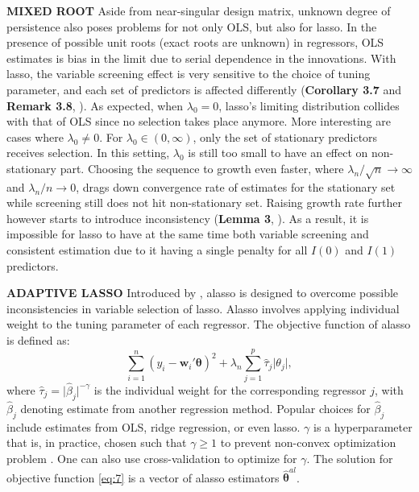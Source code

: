 \documentclass[12pt,a4paper]{article}
\DeclareMathOperator*{\argmin}{arg\,min} %
\begin{document}
\textbf{MIXED ROOT} Aside from near-singular design matrix, unknown degree of persistence also poses problems for not only OLS, but also for lasso. In the presence of possible unit roots (exact roots are unknown) in regressors, OLS estimates is bias in the limit due to serial dependence in the innovations. With lasso, the variable screening effect is very sensitive to the choice of tuning parameter, and each set of predictors is affected differently (\textbf{Corollary 3.7} and \textbf{Remark 3.8}, \cite{lee2018lasso}). As expected, when $ \lambda_0 = 0 $, lasso's limiting distribution collides with that of OLS since no selection takes place anymore. More interesting are cases where $ \lambda_0 \neq 0 $. For $ \lambda_0 \in (0, \infty) $, only the set of stationary predictors receives selection. In this setting, $ \lambda_0 $ is still too small to have an effect on non-stationary part. Choosing the sequence to growth even faster, where  $ \lambda_n/\sqrt{n} \rightarrow \infty $ and $ \lambda_n/n \rightarrow 0 $, drags down convergence rate of estimates for the stationary set while screening still does not hit non-stationary set. Raising growth rate further however starts to introduce inconsistency (\textbf{Lemma 3}, \cite{zou2006adaptive}). As a result, it is impossible for lasso to have at the same time both variable screening and consistent estimation due to it having a single penalty for all $ I(0) $ and $ I(1) $ predictors.

\textbf{ADAPTIVE LASSO} Introduced by \cite{zou2006adaptive}, alasso is designed to overcome possible inconsistencies in variable selection of lasso. Alasso involves applying individual weight to the tuning parameter of each regressor. The objective function of alasso is defined as:
\begin{equation}\label{eq:7}
	\sum_{i = 1}^n(y_i - \bm{w}_i'\bm{\theta})^2 + 
	\lambda_n\sum_{j = 1}^p \hat{\tau}_j \vert\theta_j\vert,
\end{equation}
where $ \hat{\tau}_j = \vert\hat{\beta}_j\vert^{-\gamma} $ is the individual weight for the corresponding regressor $ j $, with $ \hat{\beta}_j $ denoting estimate from another regression method. Popular choices for $ \hat{\beta}_j $ include estimates from OLS, ridge regression, or even lasso. $ \gamma $ is a hyperparameter that is, in practice, chosen such that $ \gamma \geq 1 $ to prevent non-convex optimization problem \citep{lee2018lasso}. One can also use cross-validation to optimize for $ \gamma $. The solution for objective function \eqref{eq:7} is a vector of alasso estimators $ \hat{\bm{\theta}}^{al} $.
\end{document}
